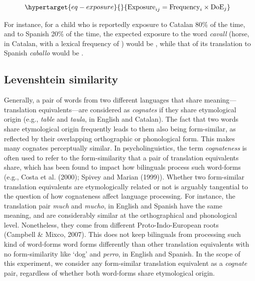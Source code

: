\documentclass[
  man,
  floatsintext,
  colorlinks=true,linkcolor=blue,citecolor=blue,urlcolor=blue,biblatex]{apa7}
\begin{document}
\begin{equation}\protect\hypertarget{eq-exposure}{}{
\text{Exposure}_{ij} = \text{Frequency}_i \times \text{DoE}_{j}
}\label{eq-exposure}\end{equation}

For instance, for a child who is reportedly exposure to Catalan 80\% of
the time, and to Spanish 20\% of the time, the expected exposure to the
word \emph{cavall} (horse, in Catalan, with a lexical frequency of )
would be , while that of its translation to Spanish \emph{caballo} would
be .

\hypertarget{levenshtein-similarity}{%
\subsection*{Levenshtein similarity}\label{levenshtein-similarity}}

Generally, a pair of words from two different languages that share
meaning---translation equivalents---are considered as \emph{cognates} if
they share etymological origin (e.g., \emph{table} and \emph{taula}, in
English and Catalan). The fact that two words share etymological origin
frequently leads to them also being form-similar, as reflected by their
overlapping orthographic or phonological form. This makes many cognates
perceptually similar. In psycholinguistics, the term \emph{cognateness}
is often used to refer to the form-similarity that a pair of translation
equivalents share, which has been found to impact how bilinguals process
such word-forms (e.g., Costa et al. (2000); Spivey and Marian (1999)).
Whether two form-similar translation equivalents are etymologically
related or not is arguably tangential to the question of how cognateness
affect language processing. For instance, the translation pair
\emph{much} and \emph{mucho}, in English and Spanish have the same
meaning, and are considerably similar at the orthographical and
phonological level. Nonetheless, they come from different
Proto-Indo-European roots (Campbell \& Mixco, 2007). This does not keep
bilinguals from processing such kind of word-forms word forms
differently than other translation equivalents with no form-similarity
like `dog' and \emph{perro}, in English and Spanish. In the scope of
this experiment, we consider any form-similar translation equivalent as
a \emph{cognate} pair, regardless of whether both word-forms share
etymological origin.
\end{document}
